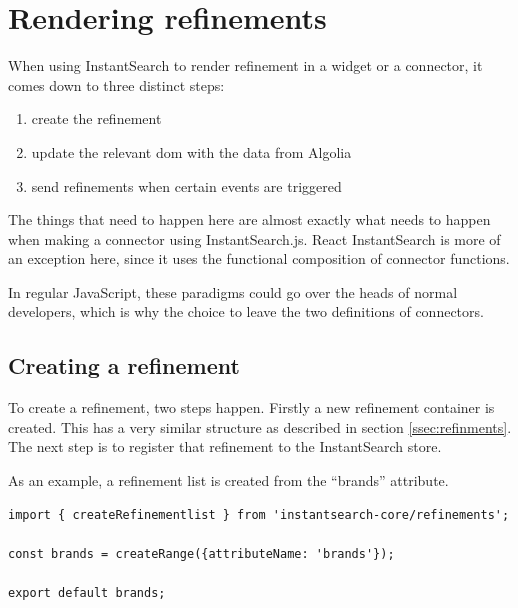 
\section{Rendering \glspl{refinement}} %
\label{sec:rendering_refinements}

When using InstantSearch to render refinement in a widget or a connector, it comes down to three distinct steps:

\begin{enumerate}
  \item create the refinement
  \item update the relevant \acrshort{dom} with the data from Algolia
  \item send \glspl{refinement} when certain events are triggered
\end{enumerate}

The things that need to happen here are almost exactly what needs to happen when making a connector using InstantSearch.js. React InstantSearch is more of an exception here, since it uses the functional composition of connector functions.

In regular JavaScript, these paradigms could go over the heads of normal developers, which is why the choice to leave the two definitions of connectors.

\subsection{Creating a refinement}
\label{subs:creating_a_refinement}

To create a refinement, two steps happen. Firstly a new refinement container is created. This has a very similar structure as described in section \ref{ssec:refinments}. The next step is to register that refinement to the InstantSearch store.

As an example, a refinement list is created from the ``brands'' attribute. %

\begin{minipage}{\linewidth}
\begin{lstlisting}[caption={Creating a refinement},label={lst:creating-refinement}]
import { createRefinementlist } from 'instantsearch-core/refinements';

const brands = createRange({attributeName: 'brands'});

export default brands;
\end{lstlisting}
\end{minipage}

